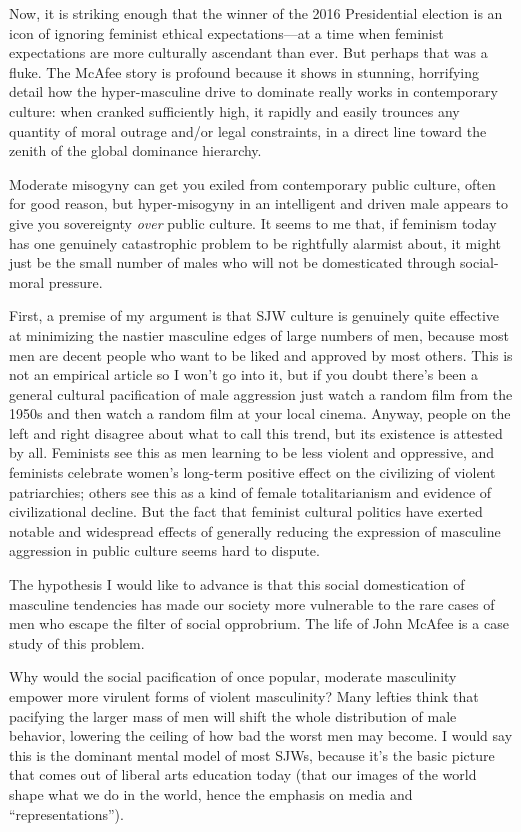\documentclass[a4paper,12pt,margin=.5in]{article}
\begin{document}
Now, it is striking enough that the winner of the 2016 Presidential
election is an icon of ignoring feminist ethical expectations---at a
time when feminist expectations are more culturally ascendant than ever.
But perhaps that was a fluke. The McAfee story is profound because it
shows in stunning, horrifying detail how the hyper-masculine drive to
dominate really works in contemporary culture: when cranked sufficiently
high, it rapidly and easily trounces any quantity of moral outrage
and/or legal constraints, in a direct line toward the zenith of the
global dominance hierarchy.

Moderate misogyny can get you exiled from contemporary public culture,
often for good reason, but hyper-misogyny in an intelligent and driven
male appears to give you sovereignty \emph{over} public culture. It
seems to me that, if feminism today has one genuinely catastrophic
problem to be rightfully alarmist about, it might just be the small
number of males who will not be domesticated through social-moral
pressure.

First, a premise of my argument is that SJW culture is genuinely quite
effective at minimizing the nastier masculine edges of large numbers of
men, because most men are decent people who want to be liked and
approved by most others. This is not an empirical article so I won't go
into it, but if you doubt there's been a general cultural pacification
of male aggression just watch a random film from the 1950s and then
watch a random film at your local cinema. Anyway, people on the left and
right disagree about what to call this trend, but its existence is
attested by all. Feminists see this as men learning to be less violent
and oppressive, and feminists celebrate women's long-term positive
effect on the civilizing of violent patriarchies; others see this as a
kind of female totalitarianism and evidence of civilizational decline.
But the fact that feminist cultural politics have exerted notable and
widespread effects of generally reducing the expression of masculine
aggression in public culture seems hard to dispute.

The hypothesis I would like to advance is that this social domestication
of masculine tendencies has made our society more vulnerable to the rare
cases of men who escape the filter of social opprobrium. The life of
John McAfee is a case study of this problem.

Why would the social pacification of once popular, moderate masculinity
empower more virulent forms of violent masculinity? Many lefties think
that pacifying the larger mass of men will shift the whole distribution
of male behavior, lowering the ceiling of how bad the worst men may
become. I would say this is the dominant mental model of most SJWs,
because it's the basic picture that comes out of liberal arts education
today (that our images of the world shape what we do in the world, hence
the emphasis on media and ``representations'').
\end{document}
